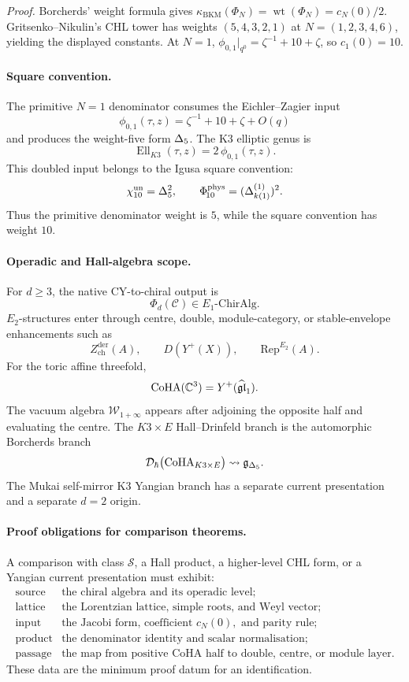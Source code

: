 \emph{Proof.}
Borcherds' weight formula gives
\(\kappa_{\mathrm{BKM}}(\Phi_N)=\operatorname{wt}(\Phi_N)=c_N(0)/2\).
Gritsenko--Nikulin's CHL tower has weights \((5,4,3,2,1)\) at
\(N=(1,2,3,4,6)\), yielding the displayed constants. At \(N=1\),
\(\phi_{0,1}|_{q^0}=\zeta^{-1}+10+\zeta\), so \(c_1(0)=10\).

\paragraph{Square convention.}
The primitive \(N=1\) denominator consumes the Eichler--Zagier input
\[
  \phi_{0,1}(\tau,z)=\zeta^{-1}+10+\zeta+O(q)
\]
and produces the weight-five form \(\Delta_{5}\). The K3 elliptic genus is
\[
  \operatorname{Ell}_{K3}(\tau,z)=2\,\phi_{0,1}(\tau,z).
\]
This doubled input belongs to the Igusa square convention:
\[
  \chi_{10}^{\mathrm{un}}=\Delta_{5}^2,
  \qquad
  \Phi_{\!10}^{\mathrm{phys}}=(\Delta_{k(1)}^{(1)})^2 .
\]
Thus the primitive denominator weight is \(5\), while the square
convention has weight \(10\).

\paragraph{Operadic and Hall-algebra scope.}
For \(d\geq3\), the native CY-to-chiral output is
\[
  \Phi_d(\mathcal C)\in E_1\text{-}\mathrm{ChirAlg}.
\]
\(E_2\)-structures enter through centre, double, module-category, or
stable-envelope enhancements such as
\[
  Z^{\mathrm{der}}_{\mathrm{ch}}(A),\qquad
  D(Y^+(X)),\qquad
  \mathrm{Rep}^{E_2}(A).
\]
For the toric affine threefold,
\[
  \operatorname{CoHA}(\mathbb{C}^{3})=Y^+(\widehat{\mathfrak{gl}}_1).
\]
The vacuum algebra \(\mathcal W_{1+\infty}\) appears after adjoining
the opposite half and evaluating the centre. The \(K3\times E\)
Hall--Drinfeld branch is the automorphic Borcherds branch
\[
  \mathcal D_{\hbar}\bigl(\operatorname{CoHA}_{K3\times E}\bigr)\leadsto\mathfrak{g}_{\Delta_{5}} .
\]
The Mukai self-mirror K3 Yangian branch has a separate current
presentation and a separate \(d=2\) origin.

\paragraph{Proof obligations for comparison theorems.}
A comparison with class \(\mathcal S\), a Hall product, a higher-level
CHL form, or a Yangian current presentation must exhibit:
\[
\begin{array}{ll}
\text{source} & \text{the chiral algebra and its operadic level};\\
\text{lattice} & \text{the Lorentzian lattice, simple roots, and Weyl vector};\\
\text{input} & \text{the Jacobi form, coefficient }c_N(0),\text{ and parity rule};\\
\text{product} & \text{the denominator identity and scalar normalisation};\\
\text{passage} & \text{the map from positive CoHA half to double, centre, or module layer}.
\end{array}
\]
These data are the minimum proof datum for an identification.
